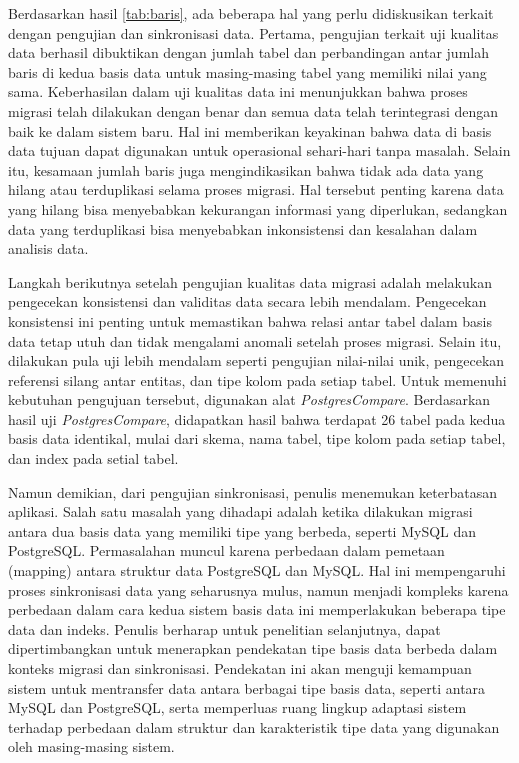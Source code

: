     Berdasarkan hasil \ref{tab:baris}, ada beberapa hal yang perlu didiskusikan terkait dengan pengujian dan sinkronisasi data. Pertama, pengujian terkait uji kualitas data berhasil dibuktikan dengan jumlah tabel dan perbandingan antar jumlah baris di kedua basis data untuk masing-masing tabel yang memiliki nilai yang sama. Keberhasilan dalam uji kualitas data ini menunjukkan bahwa proses migrasi telah dilakukan dengan benar dan semua data telah terintegrasi dengan baik ke dalam sistem baru. Hal ini memberikan keyakinan bahwa data di basis data tujuan dapat digunakan untuk operasional sehari-hari tanpa masalah. Selain itu, kesamaan jumlah baris juga mengindikasikan bahwa tidak ada data yang hilang atau terduplikasi selama proses migrasi. Hal tersebut penting karena data yang hilang bisa menyebabkan kekurangan informasi yang diperlukan, sedangkan data yang terduplikasi bisa menyebabkan inkonsistensi dan kesalahan dalam analisis data.

    Langkah berikutnya setelah pengujian kualitas data migrasi adalah melakukan pengecekan konsistensi dan validitas data secara lebih mendalam. Pengecekan konsistensi ini penting untuk memastikan bahwa relasi antar tabel dalam basis data tetap utuh dan tidak mengalami anomali setelah proses migrasi. Selain itu, dilakukan pula uji lebih mendalam seperti pengujian nilai-nilai unik, pengecekan referensi silang antar entitas, dan tipe kolom pada setiap tabel. Untuk memenuhi kebutuhan pengujuan tersebut, digunakan alat \emph{PostgresCompare}. Berdasarkan hasil uji \emph{PostgresCompare}, didapatkan hasil bahwa terdapat 26 tabel pada kedua basis data identikal, mulai dari skema, nama tabel, tipe kolom pada setiap tabel, dan index pada setial tabel. 

    Namun demikian, dari pengujian sinkronisasi, penulis menemukan keterbatasan aplikasi. Salah satu masalah yang dihadapi adalah ketika dilakukan migrasi antara dua basis data yang memiliki tipe yang berbeda, seperti MySQL dan PostgreSQL. Permasalahan muncul karena perbedaan dalam pemetaan (mapping) antara struktur data PostgreSQL dan MySQL. Hal ini mempengaruhi proses sinkronisasi data yang seharusnya mulus, namun menjadi kompleks karena perbedaan dalam cara kedua sistem basis data ini memperlakukan beberapa tipe data dan indeks. Penulis berharap untuk penelitian selanjutnya, dapat dipertimbangkan untuk menerapkan pendekatan tipe basis data berbeda dalam konteks migrasi dan sinkronisasi. Pendekatan ini akan menguji kemampuan sistem untuk mentransfer data antara berbagai tipe basis data, seperti antara MySQL dan PostgreSQL, serta memperluas ruang lingkup adaptasi sistem terhadap perbedaan dalam struktur dan karakteristik tipe data yang digunakan oleh masing-masing sistem.


